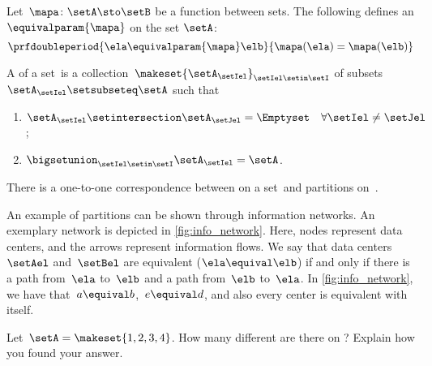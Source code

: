 \begin{example}
    Let~$\mapa\colon \setA \sto \setB$ be a function between sets.
    The following defines an  $\equivalparam{\mapa}$ on the set $\setA$:
    \begin{equation}
        \prfdoubleperiod{
            \ela\equivalparam{\mapa} \elb
        }{
            \mapa(\ela)=\mapa(\elb)
        }
    \end{equation}
\end{example}

\begin{ctdefinition}[Partition]
    \label{def:partition}
    A  of a set~\setA is a collection~$\makeset{\setA_\setIel}_{\setIel\setin \setI}$ of subsets~$\setA_\setIel\setsubseteq \setA$ such that
    \begin{enumerate}
        \item $\setA_\setIel\setintersection \setA_\setJel=\Emptyset \quad \forall \setIel\neq \setJel$;
        \item $\bigsetunion_{\setIel\setin \setI}\setA_\setIel=\setA$.
    \end{enumerate}
\end{ctdefinition}

\begin{remark}
    There is a one-to-one correspondence between  on a set~\setA and partitions on~\setA.
\end{remark}

\begin{marginfigure}
    \centering
    \caption{
        \label{fig:info_network}
    }
\end{marginfigure}

\begin{example}
    An example of partitions can be shown through information networks.
    An exemplary network is depicted in \cref{fig:info_network}.
    Here, nodes represent data centers, and the arrows represent information flows.
    We say that data centers~$\setAel$ and~$\setBel$ are equivalent ($\ela\equival \elb$) if and only if there is a path from~$\ela$ to~$\elb$ and a path from~$\elb$ to~$\ela$.
    In \cref{fig:info_network}, we have that~$a\equival b$,~$e\equival d$, and also every center is equivalent with itself.
\end{example}

\vfill
\begin{gradedexercise}
    \label{ex:CountingEquivalenceRelations}
    Let~$\setA = \makeset{ 1, 2, 3, 4 }$.
    How many different  are there on \setA?
    Explain how you found your answer.
\end{gradedexercise}

